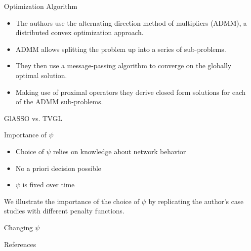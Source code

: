 \documentclass{beamer}
\begin{document}
\begin{frame}{Optimization Algorithm}
    \begin{itemize}
        \item The authors use the alternating direction method of multipliers (ADMM), a distributed convex optimization approach.
        \item ADMM allows splitting the problem up into a series of sub-problems.
        \item They then use a message-passing algorithm to converge on the globally optimal solution.
        \item Making use of proximal operators they derive closed form solutions for each of the ADMM sub-problems.
    \end{itemize}
\end{frame}

\begin{frame}{GlASSO vs. TVGL}
  


\end{frame}


\begin{frame}{Importance of $\psi$}
    \begin{itemize}
        \item Choice of $\psi$ relies on knowledge about network behavior
        \item No a priori decision possible
        \item $\psi$ is fixed over time
    \end{itemize}
    We illustrate the importance of the choice of $\psi$ by replicating the author's case studies with different
    penalty functions.
\end{frame}

\begin{frame}{Changing $\psi$}

\end{frame}

\begin{frame}{References}
    \nocite{*}
    
    
\end{frame}
\end{document}
